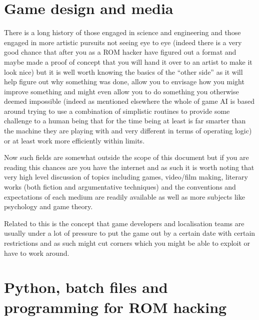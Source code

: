 \documentclass[
]{book}
\begin{document}
\hypertarget{game-design-and-media}{%
\chapter{Game design and media}\label{game-design-and-media}}

There is a long history of those engaged in science and engineering and those engaged in more artistic pursuits not seeing eye to eye (indeed there is a very good chance that after you as a ROM hacker have figured out a format and maybe made a proof of concept that you will hand it over to an artist to make it look nice) but it is well worth knowing the basics of the ``other side'' as it will help figure out why something was done, allow you to envisage how you might improve something and might even allow you to do something you otherwise deemed impossible (indeed as mentioned elsewhere the whole of game AI is based around trying to use a combination of simplistic routines to provide some challenge to a human being that for the time being at least is far smarter than the machine they are playing with and very different in terms of operating logic) or at least work more efficiently within limits.

Now such fields are somewhat outside the scope of this document but if you are reading this chances are you have the internet and as such it is worth noting that very high level discussion of topics including games, video/film making, literary works (both fiction and argumentative techniques) and the conventions and expectations of each medium are readily available as well as more subjects like psychology and game theory.

Related to this is the concept that game developers and localisation teams are usually under a lot of pressure to put the game out by a certain date with certain restrictions and as such might cut corners which you might be able to exploit or have to work around.

\hypertarget{python-batch-files-and-programming-for-rom-hacking}{%
\chapter{Python, batch files and programming for ROM hacking}\label{python-batch-files-and-programming-for-rom-hacking}}
\end{document}
